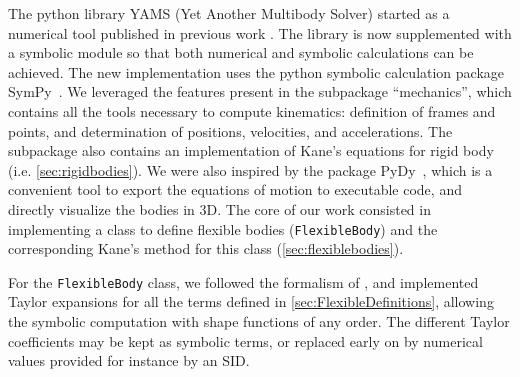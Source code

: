\documentclass[wes, manuscript]{copernicus}
\begin{document}
The python library YAMS (Yet Another Multibody Solver) started as a numerical tool published in previous work \citep{branlard:2019flex}.
The library is now supplemented with a symbolic module so that both numerical and symbolic calculations can be achieved.
The new implementation uses the python symbolic calculation package SymPy~\citep{sympy}.
We leveraged the features present in the subpackage ``mechanics'', which contains all the tools necessary to compute kinematics: definition of frames and points, and determination of positions, velocities, and accelerations.
The subpackage also contains an implementation of Kane's equations for rigid body (i.e. \autoref{sec:rigidbodies}).
We were also inspired by the package PyDy~\citep{Gede:2013}, which is a convenient tool to export the equations of motion to executable code, and directly visualize the bodies in 3D.
The core of our work consisted in implementing a class to define flexible bodies (\texttt{FlexibleBody}) and the corresponding Kane's method for this class (\autoref{sec:flexiblebodies}).  

For the \texttt{FlexibleBody} class, we followed the formalism of \cite{Wallrapp:1994}, and implemented Taylor expansions for all the terms defined in \autoref{sec:FlexibleDefinitions}, allowing the symbolic computation with shape functions of any order. 
The different Taylor coefficients may be kept as symbolic terms, or replaced early on by numerical values provided for instance by an SID. 
\end{document}
